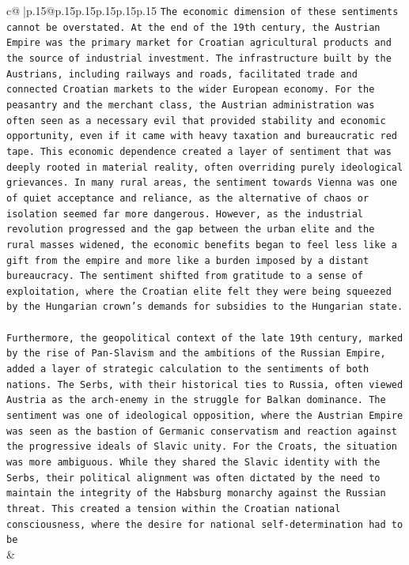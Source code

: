 \documentclass{article}
\begin{document}
{\begin{supertabular}{c@{$\;$}|p{.15\linewidth}@{}p{.15\linewidth}p{.15\linewidth}p{.15\linewidth}p{.15\linewidth}p{.15\linewidth}}
{{{\texttt{The economic dimension of these sentiments cannot be overstated. At the end of the 19th century, the Austrian Empire was the primary market for Croatian agricultural products and the source of industrial investment. The infrastructure built by the Austrians, including railways and roads, facilitated trade and connected Croatian markets to the wider European economy. For the peasantry and the merchant class, the Austrian administration was often seen as a necessary evil that provided stability and economic opportunity, even if it came with heavy taxation and bureaucratic red tape. This economic dependence created a layer of sentiment that was deeply rooted in material reality, often overriding purely ideological grievances. In many rural areas, the sentiment towards Vienna was one of quiet acceptance and reliance, as the alternative of chaos or isolation seemed far more dangerous. However, as the industrial revolution progressed and the gap between the urban elite and the rural masses widened, the economic benefits began to feel less like a gift from the empire and more like a burden imposed by a distant bureaucracy. The sentiment shifted from gratitude to a sense of exploitation, where the Croatian elite felt they were being squeezed by the Hungarian crown's demands for subsidies to the Hungarian state.} \\
\\ 
\texttt{Furthermore, the geopolitical context of the late 19th century, marked by the rise of Pan{-}Slavism and the ambitions of the Russian Empire, added a layer of strategic calculation to the sentiments of both nations. The Serbs, with their historical ties to Russia, often viewed Austria as the arch{-}enemy in the struggle for Balkan dominance. The sentiment was one of ideological opposition, where the Austrian Empire was seen as the bastion of Germanic conservatism and reaction against the progressive ideals of Slavic unity. For the Croats, the situation was more ambiguous. While they shared the Slavic identity with the Serbs, their political alignment was often dictated by the need to maintain the integrity of the Habsburg monarchy against the Russian threat. This created a tension within the Croatian national consciousness, where the desire for national self{-}determination had to be} \\
            }
        }
    }
    & \\ \\


\end{supertabular}}
\end{document}

